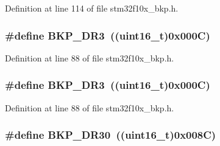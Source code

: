 Definition at line 114 of file stm32f10x\+\_\+bkp.\+h.

\subsubsection[{\texorpdfstring{B\+K\+P\+\_\+\+D\+R3}{BKP_DR3}}]{\setlength{\rightskip}{0pt plus 5cm}\#define B\+K\+P\+\_\+\+D\+R3~(({\bf uint16\+\_\+t})0x000\+C)}\hypertarget{group___data___backup___register_gadcc77540e016c6e8dffab223af35ae88}{}\label{group___data___backup___register_gadcc77540e016c6e8dffab223af35ae88}


Definition at line 88 of file stm32f10x\+\_\+bkp.\+h.

\subsubsection[{\texorpdfstring{B\+K\+P\+\_\+\+D\+R3}{BKP_DR3}}]{\setlength{\rightskip}{0pt plus 5cm}\#define B\+K\+P\+\_\+\+D\+R3~(({\bf uint16\+\_\+t})0x000\+C)}\hypertarget{group___data___backup___register_gadcc77540e016c6e8dffab223af35ae88}{}\label{group___data___backup___register_gadcc77540e016c6e8dffab223af35ae88}


Definition at line 88 of file stm32f10x\+\_\+bkp.\+h.

\subsubsection[{\texorpdfstring{B\+K\+P\+\_\+\+D\+R30}{BKP_DR30}}]{\setlength{\rightskip}{0pt plus 5cm}\#define B\+K\+P\+\_\+\+D\+R30~(({\bf uint16\+\_\+t})0x008\+C)}\hypertarget{group___data___backup___register_ga7114464779c0f0e008ec79f66aac9568}{}\label{group___data___backup___register_ga7114464779c0f0e008ec79f66aac9568}


